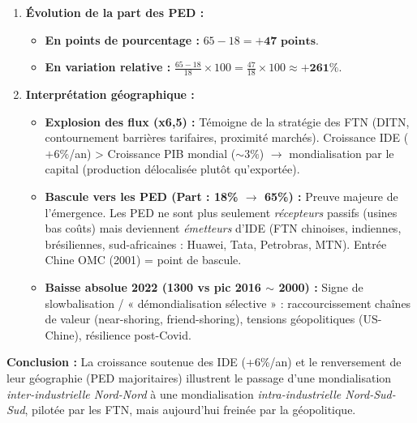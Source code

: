 \documentclass[11pt]{article}
\newcommand{\cle}[1]{{\popxbold\color{popdark}#1}}
\begin{document}
\begin{exoresolu}
\begin{enumerate}
        \item \textbf{Évolution de la part des PED :}
            \begin{itemize}
                \item \textbf{En points de pourcentage :} $65 - 18 = \textbf{+47 points}$.
                \item \textbf{En variation relative :} $\frac{65 - 18}{18} \times 100 = \frac{47}{18} \times 100 \approx \textbf{+261\%}$.
            \end{itemize}
        
        \item \textbf{Interprétation géographique :}
            \begin{itemize}
                \item \textbf{Explosion des flux (x6,5) :} Témoigne de la stratégie des FTN (DITN, contournement barrières tarifaires, proximité marchés). Croissance IDE ($+6\%$/an) > Croissance PIB mondial ($\sim 3\%$) $\rightarrow$ \cle{mondialisation par le capital} (production délocalisée plutôt qu'exportée).
                \item \textbf{Bascule vers les PED (Part : 18\% $\rightarrow$ 65\%) :} Preuve majeure de l'émergence. Les PED ne sont plus seulement \emph{récepteurs} passifs (usines bas coûts) mais deviennent \emph{émetteurs} d'IDE (FTN chinoises, indiennes, brésiliennes, sud-africaines : Huawei, Tata, Petrobras, MTN). Entrée Chine OMC (2001) = point de bascule.
                \item \textbf{Baisse absolue 2022 (1300 vs pic 2016 $\sim$ 2000) :} Signe de \cle{slowbalisation} / « démondialisation sélective » : raccourcissement chaînes de valeur (near-shoring, friend-shoring), tensions géopolitiques (US-Chine), résilience post-Covid.
            \end{itemize}
    \end{enumerate}
    \textbf{Conclusion :} La croissance soutenue des IDE (+6\%/an) et le renversement de leur géographie (PED majoritaires) illustrent le passage d'une mondialisation \emph{inter-industrielle Nord-Nord} à une mondialisation \emph{intra-industrielle Nord-Sud-Sud}, pilotée par les FTN, mais aujourd'hui freinée par la géopolitique.
\end{exoresolu}
\end{document}
